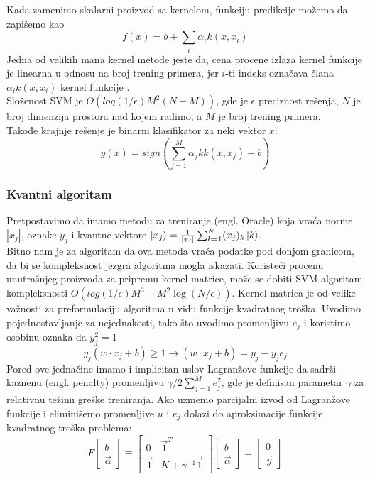 \documentclass[12pt, letterpaper, oneside]{article}
\begin{document}
Kada zamenimo skalarni proizvod sa kernelom, funkciju predikcije možemo da zapišemo kao
\[
    f(x) = b + \sum_i \alpha_{i}k(x,x_i)
\]
Jedna od velikih mana kernel metode jeste da, cena procene izlaza kernel funkcije je linearna u odnosu na broj trening primera, jer $i$-ti indeks označava člana $\alpha_ik(x,x_i)$ kernel funkcije \cite{goodfellow2016deep}. \\
Složenost SVM je $O(log(1/\epsilon)M^2(N+M))$, gde je $\epsilon$ preciznost rešenja, $N$ je broj dimenzija prostora nad kojem radimo, a $M$ je broj trening primera. \\
Takođe krajnje rešenje je binarni klasifikator za neki vektor $x$:
\[
    y(x) = sign(\sum_{j=1}^{M}\alpha_jkk(x,x_j) + b)
\]

\subsubsection{Kvantni algoritam}
Pretpostavimo da imamo metodu za treniranje (engl. Oracle) koja vraća norme $|x_j|$, oznake $y_j$ i kvantne vektore $\Ket{x_j} = \frac{1}{|x_j|}\sum_{k=1}^{N}(x_j)_k\Ket{k}$. \\
Bitno nam je za algoritam da ova metoda vraća podatke pod donjom granicom, da bi se kompleksnost jezgra algoritma mogla iskazati.
Koristeći procenu unutrašnjeg proizvoda za pripremu kernel matrice, može se dobiti SVM algoritam kompleksnosti $O(log(1/\epsilon)M^3 + M^{2}\log(N/\epsilon))$.
Kernel matrica je od velike važnosti za preformulaciju algoritma u vidu funkcije kvadratnog troška. 
Uvodimo pojednostavljanje za nejednakosti, tako što uvodimo promenljivu $e_j$ i koristimo osobinu oznaka da $y_j^2=1$
\[
    y_{j}(w \cdot x_j + b) \geq 1 \to (w \cdot x_j + b) = y_{j} - y_{j}e_{j}
\]
Pored ove jednačine imamo i implicitan uslov Lagranžove funkcije da sadrži kaznenu (engl. penalty) promenljivu
$\gamma/2\sum_{j=1}^{M}e_j^2$, gde je definisan parametar $\gamma$ za relativnu težinu greške treniranja.
Ako uzmemo parcijalni izvod od Lagranžove funkcije i eliminišemo promenljive $u$ i $e_j$ dolazi do aproksimacije funkcije kvadratnog troška problema:
\[
    F\begin{bmatrix}
        b \\
        \overrightarrow{\alpha}
    \end{bmatrix}
    \equiv \begin{bmatrix}
        0 & \overrightarrow{1}^T \\
        \overrightarrow{1} & K+\gamma^{-1} \overrightarrow{1}
    \end{bmatrix}
    \begin{bmatrix}
        b \\
        \overrightarrow{\alpha}
    \end{bmatrix} =
    \begin{bmatrix}
        0 \\
        \overrightarrow{y}
    \end{bmatrix}
\]
\end{document}
